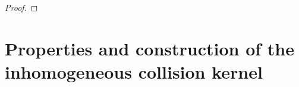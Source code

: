 \documentclass[preprint,1p,times]{elsarticle}
\theoremstyle{definition}
\theoremstyle{remark}
\begin{document}
\begin{proof}

\end{proof}



\section{Properties and construction of the inhomogeneous collision kernel}
\label{app:prop}
\end{document}
